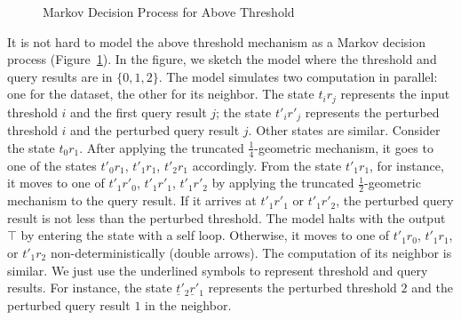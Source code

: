 \begin{figure}
{
    }
  \caption{Markov Decision Process for Above Threshold}
  \label{figure:mdp-above-threshold}
\end{figure}

It is not hard to model the above threshold mechanism as a Markov
decision process (Figure~\ref{figure:mdp-above-threshold}). In the
figure, we sketch the model where the threshold and query results are
in $\{ 0, 1, 2 \}$. The model simulates two computation in parallel:
one for the dataset, the other for its neighbor. The state $t_ir_j$
represents the input threshold $i$ and the first query result
$j$; the state $t'_ir'_j$ represents the perturbed threshold $i$ and
the perturbed query result $j$. Other states are similar. Consider the
state $t_0r_1$. After applying the truncated $\frac{1}{4}$-geometric
mechanism, it goes to one of the states $t'_0r_1$, $t'_1r_1$, $t'_2r_1$
accordingly. From the state $t'_1r_1$, for instance, it moves to one
of $t'_1r'_0$, $t'_1r'_1$, $t'_1r'_2$ by applying the truncated
$\frac{1}{2}$-geometric mechanism to the query result. If it arrives
at $t'_1r'_1$ or $t'_1r'_2$, the perturbed query result is not less
than the perturbed threshold. The model halts with the output $\top$
by entering the state with a self loop. 
Otherwise, it moves to one of $t'_1r_0$, $t'_1r_1$, or $t'_1r_2$
non-deterministically (double arrows). The computation of
its neighbor is similar. We just use the underlined symbols to
represent threshold and query results. For instance, the state
$\underline{t}'_2\underline{r}'_1$ represents the perturbed threshold
$2$ and the perturbed query result $1$ in the neighbor.

